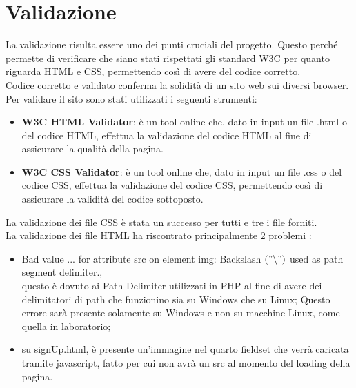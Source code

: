 \section{Validazione}
La validazione risulta essere uno dei punti cruciali del progetto. Questo perché permette di verificare che siano stati rispettati gli standard W3C per quanto riguarda HTML e CSS, permettendo così di avere del codice corretto.\\
Codice corretto e validato conferma la solidità di un sito web sui diversi browser. \\
Per validare il sito sono stati utilizzati i seguenti strumenti:
\begin{itemize}
	\item \textbf{W3C HTML Validator}: è un tool online che, dato in input un file .html o del codice HTML, effettua la validazione del codice HTML al fine di assicurare la qualità della pagina.
	\item \textbf{W3C CSS Validator}: è un tool online che, dato in input un file .css o del codice CSS, effettua la validazione del codice CSS, permettendo così di assicurare la validità del codice sottoposto.
\end{itemize}

La validazione dei file CSS è stata un successo per tutti e tre i file forniti. \\
La validazione dei file HTML ha riscontrato principalmente 2 problemi :
\begin{itemize}
  \item Bad value ... for attribute src on element img: Backslash $("\backslash")$ used as path segment delimiter., \\ questo è dovuto ai Path Delimiter utilizzati in PHP al fine di avere dei delimitatori di path che funzionino sia su Windows che su Linux; Questo errore sarà presente solamente su Windows e non su macchine Linux, come quella in laboratorio;
  \item su signUp.html, è presente un'immagine nel quarto fieldset che verrà caricata tramite javascript, fatto per cui non avrà un src al momento del loading della pagina.
\end{itemize}